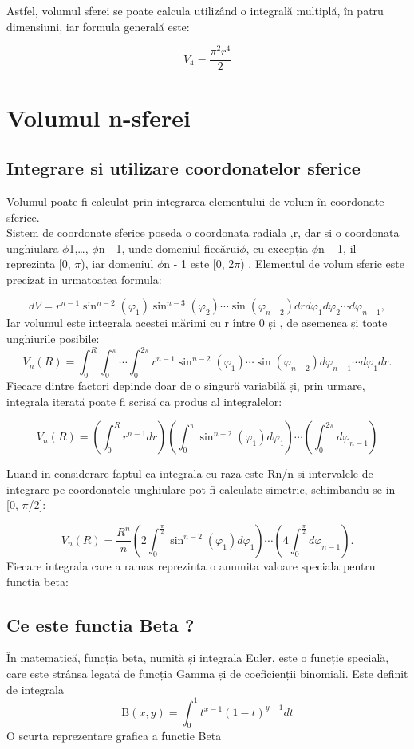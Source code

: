 \documentclass[12pt]{caltech_thesis}
\begin{document}
Astfel, volumul sferei se poate calcula utilizând o integrală multiplă, în patru dimensiuni, iar formula generală este:

$$
V_4 = \frac{\pi ^2r^4}{2}
$$

\chapter{Volumul n-sferei}
\section{Integrare si utilizare coordonatelor sferice}
Volumul poate fi calculat prin integrarea elementului de volum în coordonate sferice. \\
Sistem de coordonate sferice poseda o coordonata radiala ‚r, dar si o coordonata unghiulara \(\phi\)1,…, \(\phi\)n - 1, unde domeniul fiecărui\(\phi\), cu excepția \(\phi\)n – 1, il reprezinta [0, \(\pi\)), iar domeniul \(\phi\)n - 1 este [0, 2\(\pi\)) . Elementul de volum sferic este precizat in urmatoatea formula:



$$
d V=r^{n-1} \sin ^{n-2}\left(\varphi_{1}\right) \sin ^{n-3}\left(\varphi_{2}\right) \cdots \sin \left(\varphi_{n-2}\right) d r d \varphi_{1} d \varphi_{2} \cdots d \varphi_{n-1},
$$
Iar volumul este integrala acestei mărimi cu r între 0 și , de asemenea și toate unghiurile posibile:
$$
V_{n}(R)=\int_{0}^{R} \int_{0}^{\pi} \cdots \int_{0}^{2 \pi} r^{n-1} \sin ^{n-2}\left(\varphi_{1}\right) \cdots \sin \left(\varphi_{n-2}\right) d \varphi_{n-1} \cdots d \varphi_{1} d r .
$$
Fiecare dintre factori depinde doar de o singură variabilă și, prin urmare, integrala iterată poate fi scrisă ca produs al integralelor:

$$
V_{n}(R)=\left(\int_{0}^{R} r^{n-1} d r\right)\left(\int_{0}^{\pi} \sin ^{n-2}\left(\varphi_{1}\right) d \varphi_{1}\right) \cdots\left(\int_{0}^{2 \pi} d \varphi_{n-1}\right)
$$


Luand in considerare faptul ca integrala cu raza este Rn/n si intervalele de integrare pe coordonatele
unghiulare pot fi calculate simetric, schimbandu-se in [0, \(\pi\)/2]:


$$
V_{n}(R)=\frac{R^{n}}{n}\left(2 \int_{0}^{\frac{\pi}{2}} \sin ^{n-2}\left(\varphi_{1}\right) d \varphi_{1}\right) \cdots\left(4 \int_{0}^{\frac{\pi}{2}} d \varphi_{n-1}\right) .
$$
Fiecare integrala care a ramas reprezinta o anumita valoare speciala pentru functia beta:
\section{Ce este functia Beta ?}
În matematică, funcția beta, numită și integrala Euler, este o funcție specială, care este strânsa legată de funcția Gamma și de coeficienții binomiali. Este definit de integrala
$$
\mathrm{B}(x, y)=\int_{0}^{1} t^{x-1}(1-t)^{y-1} d t
$$
O scurta reprezentare grafica a functie Beta
\end{document}
